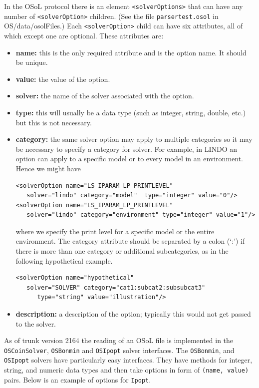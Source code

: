 \documentclass[11pt]{article}
\renewcommand{\_}{{\char"5F}}
\renewcommand{\{}{{\char"7B}}
\renewcommand{\}}{{\char"7D}}
\renewcommand{\^}{{\char"0D}}
\renewcommand{\'}{{\char"0D}}
\begin{document}
\begin{enumerate}[Step 1:]
In the OSoL protocol there is an element {\tt <solverOptions>} that can have any number of {\tt <solverOption>} 
children. (See the file {\tt parsertest.osol} in OS/data/osolFiles.)  Each {\tt <solverOption>} child can have 
six attributes, all of which except one are optional. These attributes are:

\begin{itemize}

\item {\bf name:} this is the only required attribute and is the option name. It should be unique.

\item {\bf value:}  the value of the option.

\item {\bf solver:} the name of the solver associated with the option.

\item {\bf type:} this will usually be a data type (such as integer, string, double, etc.) but this is not necessary.

\item {\bf category:} the same solver option may apply to multiple categories so it may be necessary to specify a 
category for solver. For example, in LINDO an option can apply to a specific model or to every model in an environment. 
Hence we might have

\begin{verbatim}
<solverOption name="LS_IPARAM_LP_PRINTLEVEL" 
   solver="lindo" category="model"  type="integer" value="0"/>
<solverOption name="LS_IPARAM_LP_PRINTLEVEL" 
   solver="lindo" category="environment" type="integer" value="1"/>
\end{verbatim}
where we specify the print level for a specific model or the entire environment.   The category attribute should be 
separated by a colon (`:') if there is more than one  category or  additional subcategories, 
as in the following hypothetical example.
\begin{verbatim}
<solverOption name="hypothetical" 
   solver="SOLVER" category="cat1:subcat2:subsubcat3" 
      type="string" value="illustration"/>
\end{verbatim}

\item {\bf description:} a description of the option; typically this would not get passed to the solver.

\end{itemize}

As of trunk version 2164 the reading of an
OSoL file is implemented in the {\tt OSCoinSolver}, {\tt OSBonmin} and
{\tt OSIpopt} solver interfaces.   The  {\tt OSBonmin}, and {\tt OSIpopt}
solvers have particularly easy interfaces. They have methods for integer,
string, and numeric data types and then take options in form of
{\tt (name, value)} pairs. Below is an example of options for {\tt Ipopt}.



\end{enumerate}
\end{document}
